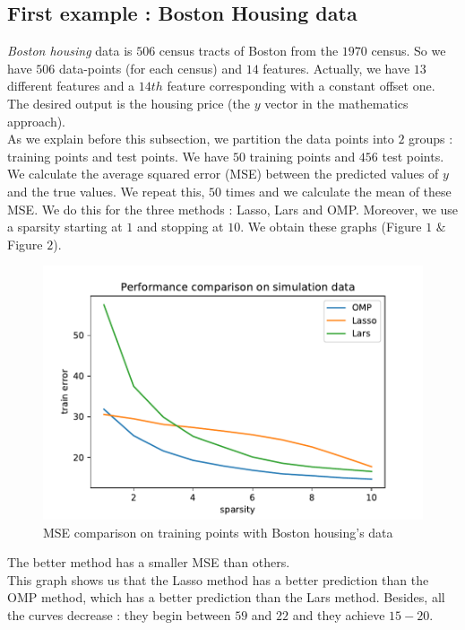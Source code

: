 \documentclass{article}
\begin{document}
\subsection{First example : Boston Housing data}
\textit{Boston housing} data is $506$ census tracts of Boston from the $1970$ census. So we have $506$ data-points (for each census) and $14$ features. Actually, we have $13$ different features and a $14th$ feature corresponding with a constant offset one. The desired output is the housing price (the $y$ vector in  the mathematics approach).\\
As we explain before this subsection, we partition the data points into $2$ groups : training points and test points. We have $50$ training points and $456$ test points. We calculate the average squared error (MSE) between the predicted values of $y$ and the true values. We repeat this, $50$ times and we calculate the mean of these MSE. We do this for the three methods : Lasso, Lars and OMP. Moreover, we use a sparsity starting at $1$ and stopping at $10$. We obtain these graphs (Figure $1$ $\&$ Figure $2$).
\begin{figure}[!ht]
    \centering
    \includegraphics[scale=0.5]{./images/training_error_housing.pdf}
    \caption{MSE comparison on training points with Boston housing's data}
    \label{Figure 1}
\end{figure}
The better method has a smaller MSE than others.\\
This graph shows us that the Lasso method has a better prediction than the OMP method, which has a better prediction than the Lars method. Besides, all the curves decrease : they begin between $59$ and $22$ and they achieve $15-20$.\\
\end{document}
